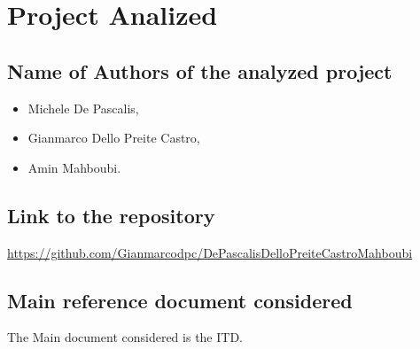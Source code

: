 \chapter{Project Analized}
\section{Name of Authors of the analyzed project}
\begin{itemize}
\item Michele De Pascalis,  
\item Gianmarco Dello Preite Castro,
\item Amin Mahboubi.
\end{itemize}
\section{Link to the repository}
\url{https://github.com/Gianmarcodpc/DePascalisDelloPreiteCastroMahboubi}
\section{Main reference document considered}
The Main document considered is the ITD.

